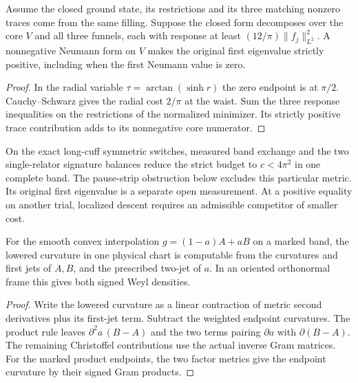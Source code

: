 \begin{proposition}
\label{prop:ed07-three-cuff-sign}
\leanok
Assume the closed ground state, its restrictions and its three
matching nonzero traces come from the same filling. Suppose the
closed form decomposes over the core $V$ and all three funnels,
each with response at least $(12/\pi)\|f_j\|^2_{L^2}$.
A nonnegative Neumann form on $V$ makes the original first eigenvalue
strictly positive, including when the first Neumann value is zero.
\end{proposition}
\begin{proof}
\leanok
In the radial variable $\tau=\arctan(\sinh r)$ the zero endpoint is
at $\pi/2$. Cauchy--Schwarz gives the radial cost $2/\pi$ at the
waist. Sum the three response inequalities on the restrictions of
the normalized minimizer. Its strictly positive trace contribution
adds to its nonnegative core numerator.
\end{proof}

On the exact long-cuff symmetric switches, measured band exchange and
the two single-relator signature balances reduce the strict budget to
$c<4\pi^2$ in one complete band. The pause-strip obstruction below
excludes this particular metric. Its original first eigenvalue is a
separate open measurement. At a positive equality on another trial,
localized descent requires an admissible competitor of smaller cost.

\begin{proposition}
\label{prop:ed52-fixed-band-curvature}
\leanok
For the smooth convex interpolation $g=(1-a)A+aB$ on a marked band,
the lowered curvature in one physical chart is computable from the
curvatures and first jets of $A,B$, and the prescribed two-jet of $a$.
In an oriented orthonormal frame this gives both signed Weyl densities.
\end{proposition}
\begin{proof}
\leanok
Write the lowered curvature as a linear contraction of metric second
derivatives plus its first-jet term. Subtract the weighted endpoint
curvatures. The product rule leaves $\partial^2a\,(B-A)$ and the
two terms pairing $\partial a$ with $\partial(B-A)$. The remaining
Christoffel contributions use the actual inverse Gram matrices.
For the marked product endpoints, the two factor metrics give the
endpoint curvature by their signed Gram products.
\end{proof}

